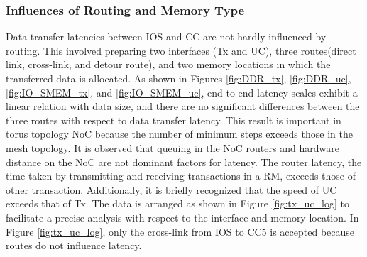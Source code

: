 \documentclass[conference,compsoc]{IEEEtran}
\newcommand{\comment}[1]{}
\begin{document}
\vspace{-3mm}
\subsubsection{Influences of Routing and Memory Type}
\label{sec:routing_and_memory}

\comment{1-20, 1-21}
Data transfer latencies between IOS and CC are not hardly influenced by routing.
This involved preparing two interfaces (Tx and UC), three routes(direct link, cross-link, and detour route), and two memory locations in which the transferred data is allocated.
As shown in Figures \ref{fig:DDR_tx}, \ref{fig:DDR_uc}, \ref{fig:IO_SMEM_tx}, and \ref{fig:IO_SMEM_uc}, 
end-to-end latency scales exhibit a linear relation with data size, and there are no significant differences between the three routes with respect to data transfer latency.
This result is important in torus topology NoC because the number of minimum steps exceeds those in the mesh topology. 
It is observed that queuing in the NoC routers and hardware distance on the NoC are not dominant factors for latency.
The router latency, the time taken by transmitting and receiving transactions in a RM, exceeds those of other transaction.
Additionally, it is briefly recognized that the speed of UC exceeds that of Tx.
The data is arranged as shown in Figure \ref{fig:tx_uc_log} to facilitate a precise analysis with respect to the interface and memory location.
In Figure \ref{fig:tx_uc_log}, only the cross-link from IOS to CC5 is accepted because routes do not influence latency.
\end{document}
